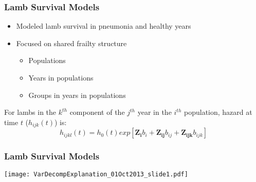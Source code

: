 \documentclass[fleqn,xcolor=table]{beamer}
\begin{document}
\begin{frame}[t]
	\frametitle{\color{darkred} Lamb Survival Models}
	
	\vspace{.2in}
	\begin{itemize}
		\item {\color{navy} Modeled lamb survival in pneumonia and
			healthy years}
		\item {\color{navy} Focused on shared frailty structure}
			\begin{itemize}
				\item[] \color{navy} Populations
				\item[] \color{navy} Years in populations
				\item[] \color{navy} Groups in years in populations
			\end{itemize}
	\end{itemize}
	\vspace{.2in}

	\footnotesize{\color{navy} For lambs in the \color{darkred}$k^{th}$
		component \color{navy}of the
		\color{darkred}$j^{th}$ year \color{navy}in the
		\color{darkred}$i^{th}$ population\color{navy}, hazard at time
		$t$ ($h_{ijk}(t)$) is:
\[h_{ijkl}(t)=h_{0}(t)exp\left[\mathbf{Z_{i}}b_{i} +\mathbf{Z_{ij}} b_{ij} +
\mathbf{Z_{ijk}} b_{ijk}\right]\]
}
\end{frame}

\begin{frame}[t]
	\frametitle{\color{darkred} Lamb Survival Models}
	\vspace{.2in}

	\texttt{[image: VarDecompExplanation\_01Oct2013\_slide1.pdf]}
%	
%
\end{frame}
\end{document}
